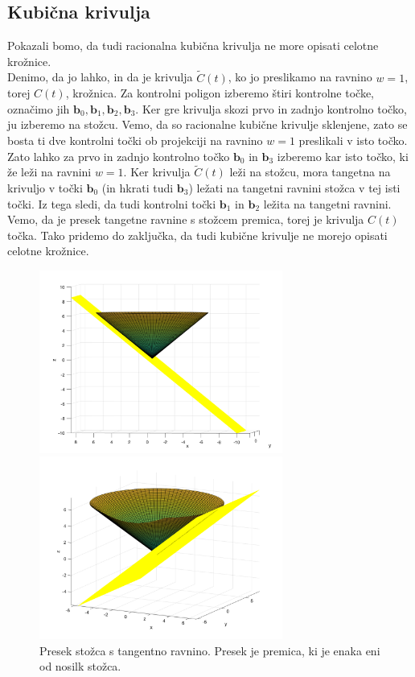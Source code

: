 \documentclass[a4paper,11pt]{article}
\theoremstyle{definition}
\theoremstyle{plain}
\begin{document}
\subsection{Kubična krivulja}
Pokazali bomo, da tudi racionalna kubična krivulja ne more opisati celotne krožnice. \\
Denimo, da jo lahko, in da je krivulja $\tilde{C}(t)$, ko jo preslikamo na ravnino $w = 1$, torej $C(t)$, krožnica.
Za kontrolni poligon izberemo štiri kontrolne točke, označimo jih $\boldsymbol{b}_0, \boldsymbol{b}_1, \boldsymbol{b}_2, \boldsymbol{b}_3$. Ker gre krivulja skozi prvo in zadnjo kontrolno točko, ju izberemo na stožcu.
Vemo, da so racionalne kubične krivulje sklenjene, zato se bosta ti dve kontrolni točki ob projekciji na ravnino $w = 1$ preslikali v isto točko. 
Zato lahko za prvo in zadnjo kontrolno točko $\boldsymbol{b}_0$ in $\boldsymbol{b}_3$ izberemo kar isto točko, ki že leži na ravnini $w = 1$. 
Ker krivulja $\tilde{C}(t)$ leži na stožcu, mora tangetna na krivuljo v točki $\boldsymbol{b}_0$ (in hkrati tudi $\boldsymbol{b}_3$) ležati na tangetni ravnini stožca v tej isti točki.
Iz tega sledi, da tudi kontrolni točki $\boldsymbol{b}_1$ in $\boldsymbol{b}_2$ ležita na tangetni ravnini. Vemo, da je presek tangetne ravnine s stožcem premica, torej je krivulja $C(t)$ točka.
Tako pridemo do zaključka, da tudi kubične krivulje ne morejo opisati celotne krožnice.
\begin{figure}[ht!]
    \begin{minipage}{0.5\textwidth}
        \centering
        \includegraphics[width=80mm]{stozec_tang_1.png}
    \end{minipage}\hfill
    \begin{minipage}{0.5\textwidth}
        \centering
        \includegraphics[width=80mm]{stozec_tang_2.png}
    \end{minipage}\hfill
    \caption{Presek stožca s tangentno ravnino. Presek je premica, ki je enaka eni od nosilk stožca.}
\end{figure}
\end{document}
